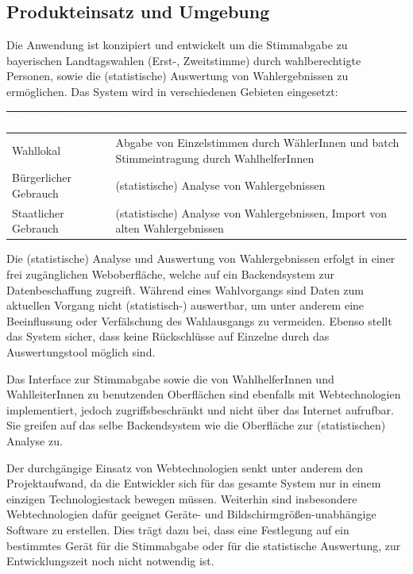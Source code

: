 \documentclass[a4paper,12pt]{article}
\begin{document}
\subsection{Produkteinsatz und Umgebung}
Die Anwendung ist konzipiert und entwickelt um die Stimmabgabe 
zu bayerischen Landtagswahlen (Erst-, Zweitstimme) durch wahlberechtigte
Personen, sowie die (statistische) Auswertung von Wahlergebnissen zu ermöglichen. 
%
Das System wird in verschiedenen Gebieten eingesetzt:

\begin{center}
\begin{tabular}{|m{5cm}|m{10cm}|}
	\hline
  \rowcolor{TUMBlue} \textcolor{white}{\textbf{Einsatzgebiet}} & \textcolor{white}{\textbf{Prozesse}} \\
  \hline
  Wahllokal & Abgabe von Einzelstimmen durch WählerInnen und batch Stimmeintragung durch WahlhelferInnen \\
	\hline
  Bürgerlicher Gebrauch & (statistische) Analyse von Wahlergebnissen \\
  \hline
  Staatlicher Gebrauch & (statistische) Analyse von Wahlergebnissen, Import von alten Wahlergebnissen \\
	\hline
\end{tabular}
\end{center}

Die (statistische) Analyse und Auswertung von Wahlergebnissen erfolgt in einer frei zugänglichen
Weboberfläche, welche auf ein Backendsystem zur Datenbeschaffung zugreift. 
Während eines Wahlvorgangs sind Daten zum aktuellen Vorgang nicht (statistisch-) auswertbar, um unter anderem eine Beeinflussung oder Verfälschung des Wahlausgangs zu vermeiden.
Ebenso stellt das System sicher, dass keine Rückschlüsse auf Einzelne durch das Auswertungstool
möglich sind.

Das Interface zur Stimmabgabe sowie die von WahlhelferInnen und WahlleiterInnen zu benutzenden Oberflächen sind 
ebenfalls mit Webtechnologien implementiert, jedoch zugriffsbeschränkt und nicht über das Internet aufrufbar. Sie greifen
auf das selbe Backendsystem wie die Oberfläche zur (statistischen) Analyse zu.

Der durchgängige Einsatz von Webtechnologien senkt unter anderem den Projektaufwand, da die Entwickler sich für das gesamte System nur in 
einem einzigen Technologiestack bewegen müssen. Weiterhin sind insbesondere 
Webtechnologien dafür geeignet Geräte- und Bildschirmgrößen-unabhängige Software zu erstellen. Dies trägt dazu bei, dass eine Festlegung auf ein bestimmtes Gerät für die Stimmabgabe oder für die statistische Auswertung, zur Entwicklungszeit noch nicht notwendig ist. 
\end{document}
